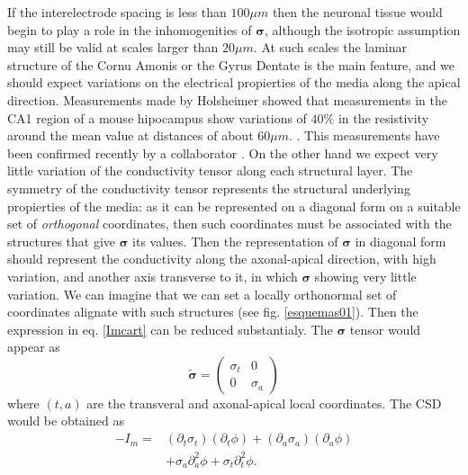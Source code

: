 \documentclass{article}
\newcommand{\cond}{\boldsymbol{\sigma}}
\begin{document}
If the interelectrode spacing
is less than $100 \mu m$ then the neuronal tissue would begin
to play a role in the inhomogenities of $\cond$, although the isotropic
assumption may still be valid at scales larger than $20 \mu m$. At such 
scales the laminar structure of the Cornu Amonis or the Gyrus Dentate is
the main feature, and we should expect variations on the electrical 
propierties of the media along the apical direction. Measurements made
by Holsheimer showed that measurements in the CA1 region of a mouse
hipocampus show variations of  $40\% $ in the resistivity around the mean
value at distances of about $60 \mu m$.
\cite{Holsheimer87}. This measurements have been confirmed
recently by a collaborator \cite{TrevinoPersonal}. On the other hand
we expect very little variation of the conductivity tensor along
each structural layer. The symmetry of the conductivity tensor represents
the structural underlying propierties of the media: as it can be 
represented on a diagonal form on a suitable set of \emph{orthogonal}
coordinates, then such coordinates must be associated with the 
structures that give $\cond$ its values. Then the representation
of $\cond$ in diagonal form should represent the conductivity
along the axonal-apical direction, with high variation, and another
axis transverse to it, in which $\cond$ showing very little variation.
We can imagine that we can set a locally orthonormal set of coordinates
alignate with such structures (see fig. \ref{esquemas01}).
 Then the expression in eq. \ref{Imcart}
can be reduced substantialy.  The $\cond$ tensor would appear as
\begin{equation}
\tilde{\cond}=
\begin{pmatrix}
\sigma_t & 0 \\
0 & \sigma_a
\end{pmatrix}
\end{equation} 
where $(t,a)$ are the transveral and axonal-apical local coordinates.
The CSD would be obtained as
\begin{equation}\label{Imapic}
\begin{split}
-I_m= & (\partial_t \sigma_{t}) (\partial_t \phi) +
(\partial_a \sigma_{a}) (\partial_a \phi)  \\
& + \sigma_{a} \partial_a^2 \phi + \sigma_{t} \partial_t^2 \phi. 
\end{split}
\end{equation}

   
\end{document}
